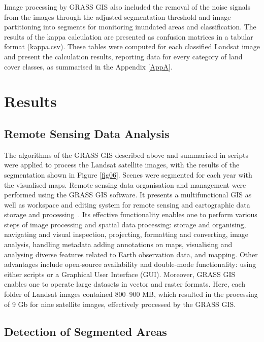 \documentclass[analytics,article,accept,pdftex,moreauthors]{Definitions/mdpi}
\begin{document}
Image processing by GRASS GIS also included the removal of the noise signals from the images through the adjusted segmentation threshold and image partitioning into segments for monitoring inundated areas and classification. The results of the kappa calculation are presented as confusion matrices in a tabular format (kappa.csv). These tables were computed for each classified Landsat image and present the calculation results, reporting data for every category of land cover classes, as summarised in the Appendix \ref{AppA}.  %

\section{Results}

\subsection{Remote Sensing Data Analysis}
The algorithms of the GRASS GIS described above and summarised in scripts were applied to process the Landsat satellite images, with the results of the segmentation shown in Figure \ref{fig06}. Scenes were segmented for each year with the visualised maps. {Remote sensing data organisation and management were performed using the GRASS GIS software. It presents a multifunctional GIS as well as workspace and editing system for remote sensing and cartographic data storage and processing}~\cite{NETELER2012124}. {Its effective functionality enables one to perform various steps of image processing and spatial data processing: storage and organising, navigating and visual inspection, projecting, formatting and converting, image analysis, handling metadata adding annotations on maps, visualising and analysing diverse features related to Earth observation data, and mapping. Other advantages include open-source availability and double-mode functionality: using either scripts or a Graphical User Interface (GUI). Moreover, GRASS GIS enables one to operate  large datasets in vector and raster formats. %
Here, each folder of Landsat images contained 800--900 MB, which resulted in the processing of 9 Gb for nine satellite images, effectively processed by the GRASS GIS. }

\subsection{Detection of Segmented Areas}
\end{document}
